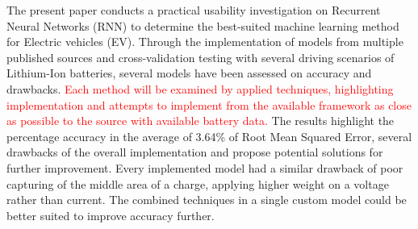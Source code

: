 %
{
The present paper conducts a practical usability investigation on Recurrent Neural Networks (RNN) to determine the best-suited machine learning method for Electric vehicles (EV).
Through the implementation of models from multiple published sources and cross-validation testing with several driving scenarios of Lithium-Ion batteries, several models have been assessed on accuracy and drawbacks.%
\textcolor{red}{Each method will be examined by applied techniques, highlighting implementation and attempts to implement from the available framework as close as possible to the source with available battery data.}
The results highlight the percentage accuracy in the average of 3.64\% of Root Mean Squared Error, several drawbacks of the overall implementation and propose potential solutions for further improvement.
Every implemented model had a similar drawback of poor capturing of the middle area of a charge, applying higher weight on a voltage rather than current.
The combined techniques in a single custom model could be better suited to improve accuracy further.
}